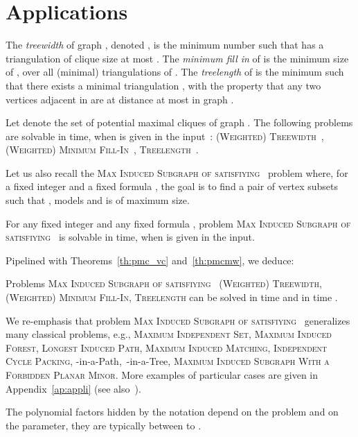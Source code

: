 \documentclass{llncs}
\newcommand{\pmc}{potential maximal clique}
\newcommand{\kip}{{\sc -in-a-Path}}
\newcommand{\kit}{{\sc -in-a-Tree}}
\newcommand{\msphit}{\textsc{Max\- Induced\- Subgraph\- of\- \- satisfiying\- }}
\begin{document}
\section{Applications}\label{se:appli}

The \emph{treewidth} of graph , denoted , is the minimum number  such that  has a triangulation  of clique size at most . The \emph{minimum fill in} of  is the minimum size of , over all (minimal) triangulations  of . The \emph{treelength} of  is the minimum  such that there exists a minimal triangulation , with the property that any two vertices adjacent in  are at distance at most  in graph . 

\begin{proposition}
Let  denote the set of \pmc s of graph . The following problems are solvable in  time, when  is given in the input~: \textsc{(Weighted) Treewidth}~{\cite{FKTV08,BoRo03}}, \textsc{(Weighted) Minimum Fill-In}~{\cite{FKTV08,Gysel13}},
\textsc{Treelength}~\cite{Lokshtanov10}.
\end{proposition}


Let us also recall the \msphit\ problem where, for a fixed integer  and a fixed  formula , the goal is to find a pair of vertex subsets  such that ,  models  and  is of maximum size. 

\begin{proposition}\label{pr:msphit}
For any fixed integer  and any fixed  formula , problem  \msphit\ is solvable in  time, when  is given in the input.
\end{proposition}



Pipelined with Theorems~\ref{th:pmc_vc} and~\ref{th:pmcmw}, we deduce:
\begin{theorem}\label{th:appli}
Problems  \msphit\ \textsc{(Weighted) Treewidth}, \textsc{(Weighted) Minimum Fill-In},  \textsc{Treelength} can be solved in time  and in time .\\
\end{theorem}
We re-emphasis that problem \msphit\ generalizes many classical problems, e.g.,  \textsc{Maximum Independent Set},  \textsc{Maximum Induced Forest},  \textsc{Longest Induced Path}, \textsc{Maximum Induced Matching}, \textsc{Independent Cycle Packing},  \kip,\ \kit, \textsc{Maximum Induced Subgraph With a Forbidden Planar Minor}. More examples of particular cases are given in Appendix~\ref{ap:appli} (see also~\cite{FoToVi14}). 

The polynomial factors hidden by the  notation depend on the problem and on the parameter, they are typically between  to . 
\end{document}
